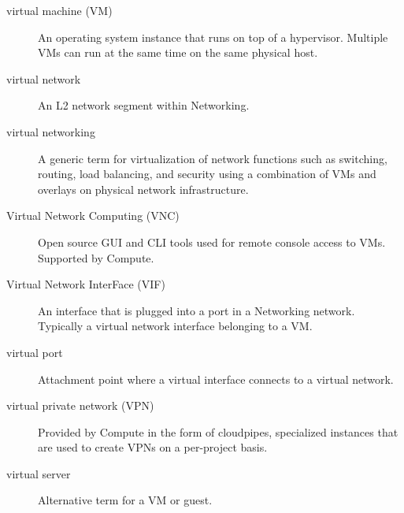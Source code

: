 \documentclass[letterpaper,10pt,english]{sphinxmanual}
\begin{document}
\begin{description}
\item[{virtual machine (VM)}] \leavevmode{}\label{_source/glossary:term-virtual-machine-vm}
An operating system instance that runs on top of a hypervisor.
Multiple VMs can run at the same time on the same physical
host.

\item[{virtual network}] \leavevmode{}\label{_source/glossary:term-virtual-network}
An L2 network segment within Networking.

\item[{virtual networking}] \leavevmode{}\label{_source/glossary:term-virtual-networking}
A generic term for virtualization of network functions
such as switching, routing, load balancing, and security using
a combination of VMs and overlays on physical network
infrastructure.

\item[{Virtual Network Computing (VNC)}] \leavevmode{}\label{_source/glossary:term-virtual-network-computing-vnc}
Open source GUI and CLI tools used for remote console access to
VMs. Supported by Compute.

\item[{Virtual Network InterFace (VIF)}] \leavevmode{}\label{_source/glossary:term-virtual-network-interface-vif}
An interface that is plugged into a port in a Networking
network. Typically a virtual network interface belonging to a
VM.

\item[{virtual port}] \leavevmode{}\label{_source/glossary:term-virtual-port}
Attachment point where a virtual interface connects to a virtual
network.

\item[{virtual private network (VPN)}] \leavevmode{}\label{_source/glossary:term-virtual-private-network-vpn}
Provided by Compute in the form of cloudpipes, specialized
instances that are used to create VPNs on a per-project basis.

\item[{virtual server}] \leavevmode{}\label{_source/glossary:term-virtual-server}
Alternative term for a VM or guest.


\end{description}
\end{document}
